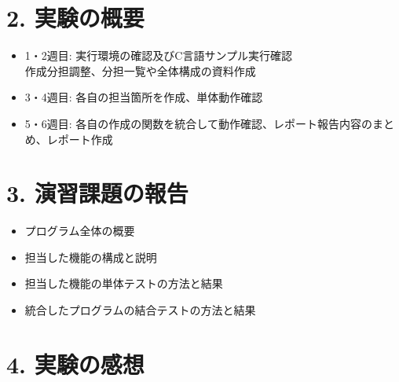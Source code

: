 \documentclass[a4paper,12pt]{article}
\begin{document}
\section*{2. 実験の概要}
\begin{itemize}
    \item 1・2週目: 実行環境の確認及びC言語サンプル実行確認 \\
    作成分担調整、分担一覧や全体構成の資料作成
    \item 3・4週目: 各自の担当箇所を作成、単体動作確認
    \item 5・6週目: 各自の作成の関数を統合して動作確認、レポート報告内容のまとめ、レポート作成
\end{itemize}

\section*{3. 演習課題の報告}
\begin{itemize}
    \item プログラム全体の概要
    \item 担当した機能の構成と説明
    \item 担当した機能の単体テストの方法と結果
    \item 統合したプログラムの結合テストの方法と結果
\end{itemize}

\section*{4. 実験の感想}
\end{document}
